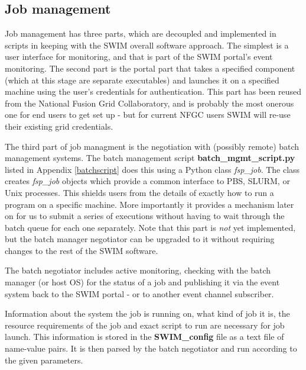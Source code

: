 \subsection{Job management}
\label{sec:jobmanager}

Job management has three parts, which are decoupled and implemented in scripts
in keeping with the SWIM overall software approach. The simplest is a user
interface for monitoring, and that is part of the SWIM portal's event
monitoring. The second part is the portal part that takes a specified component
(which at this stage are separate executables) and launches it on a specified
machine using the user's credentials for authentication. This part has been
reused from the National Fusion Grid Collaboratory, and is probably the most
onerous one for end users to get set up - but for current NFGC users SWIM will
re-use their existing grid credentials.  

The third part of job managment is the negotiation with (possibly remote) batch
management systems.
The batch management script {\bf batch\_mgmt\_script.py} listed in
Appendix \ref{batchscript} does this using
a Python class {\em fsp\_job}.  The class creates
{\em fsp\_job} objects which provide a common interface to PBS, SLURM, or
Unix processes. This shields users from the details of exactly how to run a
program on a specific machine.  More importantly it provides a mechanism
later on for us to submit a series of executions without having to wait
through the batch queue for each one separately. Note that this part
is {\em not} yet implemented, but the batch manager negotiator can be upgraded
to it without requiring changes to the rest of the SWIM software.

The batch negotiator includes active monitoring, checking with the batch manager
(or host OS) for the status of a job and publishing it via the event system
back to the SWIM portal - or to another event channel subscriber.

Information about the system the job is running on, what kind of job it is, the
resource requirements of the job and exact script to run are necessary for job
launch.  This information is stored in the {\bf SWIM\_config} file as a text
file of name-value pairs.  It is then parsed by the batch negotiator and run
according to the given parameters.

